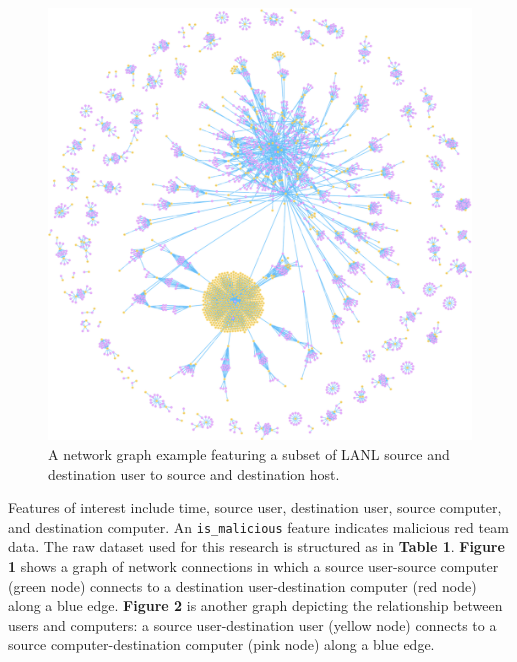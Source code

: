 \documentclass[sigconf]{acmart}
\begin{document}
\begin{figure}
  \centering
  \includegraphics[scale=0.35]{graph-deathstar2.png}
  \caption{A network graph example featuring a subset of LANL source and destination user to source and destination host.}
  \label{figure:DeathStar2}
\end{figure}



Features of interest include time, source user, destination user, source computer, and destination computer.  An \texttt{is\_malicious} feature indicates malicious red team data.  The raw dataset used for this research is structured as in \textbf{Table 1}. \textbf{Figure 1} shows a graph of network connections in which a source user-source computer (green node) connects to a destination user-destination computer (red node) along a blue edge.  \textbf{Figure 2}
is another graph depicting the relationship between users and computers: a source user-destination user (yellow node) connects to a source computer-destination computer (pink node) along a blue edge.
\end{document}
